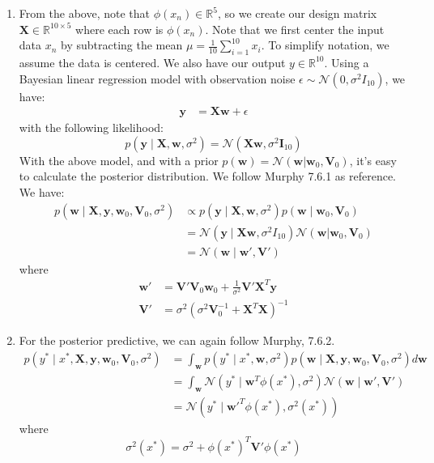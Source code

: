 \documentclass[submit]{harvardml}
\newcommand{\by}{\mathbf{y}}
\newcommand{\bw}{\mathbf{w}}
\newcommand{\distNorm}{\mathcal{N}}
\begin{document}
\begin{enumerate}
\begin{enumerate}
\item From the above, note that $\phi(x_n) \in \mathbb{R}^5$, so we create our design matrix $\mathbf X \in \mathbb{R}^{10 \times 5}$ where each row is $\phi(x_n)$. Note that we first center the input data $x_n$ by subtracting the mean $\mu = \frac{1}{10}\sum_{i=1}^{10} x_i$. To simplify notation, we assume the data is centered. We also have our output $y \in \mathbb{R}^{10}$. Using a Bayesian linear regression model with observation noise $\epsilon \sim \distNorm(0, \sigma^2 I_{10})$, we have:
\begin{align*}
\by &= \mathbf X\bw + \epsilon
\end{align*}
with the following likelihood:
$$
p(\by \mid \mathbf X, \bw, \sigma^2) = \distNorm(\mathbf X\bw, \sigma^2\mathbf I_{10})
$$
With the above model, and with a prior $p(\bw) = \distNorm(\bw | \bw_0, \mathbf V_0)$, it's easy to calculate the posterior distribution. We follow Murphy 7.6.1 as reference. We have:
\begin{align*}
p(\bw \mid \mathbf X, \by, \bw_0, \mathbf V_0, \sigma^2) &\propto p(\by \mid \mathbf X, \bw, \sigma^2)p(\bw \mid \bw_0, \mathbf V_0) \tag{by Bayes' Rule} \\
&= \distNorm(\by \mid \mathbf X\bw, \sigma^2 I_{10}) \distNorm(\bw | \bw_0, \mathbf V_0) \tag{according to our model} \\
&=\mathcal{N}(\bw \mid \bw', \mathbf V') \tag{posterior of normal likelihood and normal prior is normal}
\end{align*}
where
\begin{align*}
\bw' &= \mathbf V' \mathbf V_0 \bw_0 + \frac{1}{\sigma^2}\mathbf V' \mathbf X^T \by\\
\mathbf V' &= \sigma^2(\sigma^2 \mathbf V_0^{-1} + \mathbf X^T\mathbf X)^{-1}
\end{align*}
\item For the posterior predictive, we can again follow Murphy, 7.6.2.
\begin{align*}
p(y^* \mid x^*, \mathbf X, \by, \bw_0, \mathbf V_0, \sigma^2) &= \int_{\bw} p(y^* \mid x^*, \bw, \sigma^2)p(\bw \mid \mathbf X, \by, \bw_0, \mathbf V_0, \sigma^2) d\bw \tag{integrating out weights} \\
&= \int_{\bw} \distNorm(y^* \mid \bw^T \phi(x^*), \sigma^2) \distNorm(\bw \mid \bw', \mathbf V') \tag{given our model} \\
&= \distNorm(y^* \mid \bw'^T \phi(x^*), \sigma^2(x^*)) \tag{using conjugacy results}
\end{align*}
where
$$
\sigma^2(x^*) = \sigma^2 + \phi(x^*)^T \mathbf V' \phi(x^*)
$$


\end{enumerate}
\end{enumerate}
\end{document}
